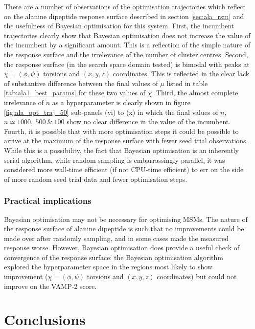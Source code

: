 There are a number of observations of the optimisation trajectories which reflect on the alanine dipeptide response surface described in section \ref{sec:ala_rsm} and the usefulness of Bayesian optimisation for this system. First, the incumbent trajectories clearly show that Bayesian optimisation does not increase the value of the incumbent by a significant amount. This is a reflection of the simple nature of the response surface and the irrelevance of the number of cluster centres. Second, the response surface (in the search space domain tested) is bimodal with peaks at $\chi=(\phi, \psi)$ torsions and $(x, y, z)$ coordinates. This is reflected in the clear lack of substantive difference between the final values of $\mu$ listed in table \ref{tab:ala1_best_params} for these two values of $\chi$.  Third, the almost complete irrelevance of $n$ as a hyperparameter is clearly shown in figure \ref{fig:ala_opt_traj_50} sub-panels (vi) to (x) in which the final values of $n$, $n \simeq 1000,\ 500\ \&\ 100$ show no clear difference in the value of the incumbent. Fourth, it is possible that with more optimisation steps it could be possible to arrive at the maximum of the response surface with fewer seed trial observations. While this is a possibility, the fact that Bayesian optimisation is an inherently serial algorithm, while random sampling is embarrassingly parallel, it was considered more wall-time efficient (if not CPU-time efficient) to err on the side of more random seed trial data and fewer optimisation steps. 

\subsubsection{Practical implications}

Bayesian optimisation may not be necessary for optimising MSMs. The nature of the response surface of alanine dipeptide is such that no improvements could be made over after randomly sampling, and in some cases made the measured response worse. However, Bayesian optimisation does provide a useful check of convergence of the response surface: the Bayesian optimisation algorithm explored the hyperparameter space in the regions most likely to show improvement ($\chi=(\phi, \psi)$ torsions and $(x, y, z)$ coordinates) but could not improve on the VAMP-2 score. 

\section{Conclusions}\label{sec:msm_conc}

